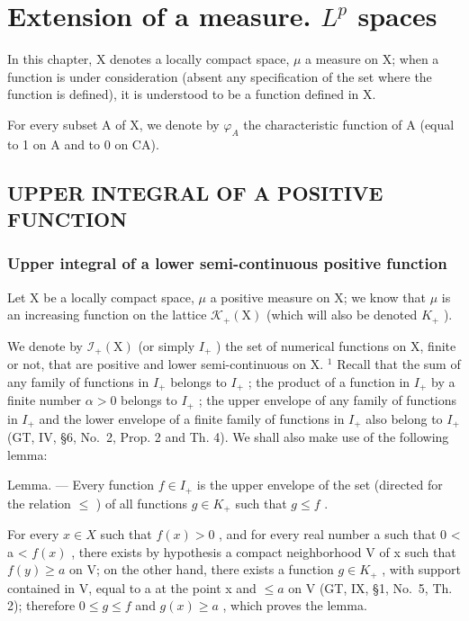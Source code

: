 \chapter{\texorpdfstring{Extension of a measure. \(L^{p}\) spaces}{Extension of a measure. L to the p spaces}}

In this chapter, X denotes a locally compact space, \(\mu\) a measure on X; when a function is under consideration (absent any specification of the set where the function is defined), it is understood to be a function defined in X.

For every subset A of X, we denote by \(\varphi_{A}\) the characteristic function of A (equal to 1 on A and to 0 on CA).

\section{UPPER INTEGRAL OF A POSITIVE FUNCTION}

\subsection{Upper integral of a lower semi-continuous positive function}

Let X be a locally compact space, \(\mu\) a positive measure on X; we know that \(\mu\) is an increasing function on the lattice \(\mathcal{K}_{+}(\mathrm{X})\) (which will also be denoted \(K_{+}\) ).

We denote by \(\mathcal{I}_{+}(\mathrm{X})\) (or simply \(I_{+}\) ) the set of numerical functions on X, finite or not, that are positive and lower semi-continuous on X. \(^{1}\) Recall that the sum of any family of functions in \(I_{+}\) belongs to \(I_{+}\) ; the product of a function in \(I_{+}\) by a finite number \(\alpha > 0\) belongs to \(I_{+}\) ; the upper envelope of any family of functions in \(I_{+}\) and the lower envelope of a finite family of functions in \(I_{+}\) also belong to \(I_{+}\) (GT, IV, §6, No.~2, Prop. 2 and Th. 4). We shall also make use of the following lemma:

Lemma. --- Every function \(f \in I_{+}\) is the upper envelope of the set (directed for the relation \(\leqslant\) ) of all functions \(g \in K_{+}\) such that \(g \leqslant f\) .

For every \(x \in X\) such that \(f(x) > 0\) , and for every real number a such that 0 < a < \(f(x)\) , there exists by hypothesis a compact neighborhood V of x such that \(f(y) \geqslant a\) on V; on the other hand, there exists a function \(g \in K_{+}\) , with support contained in V, equal to a at the point x and \(\leqslant a\) on V (GT, IX, §1, No.~5, Th. 2); therefore \(0 \leqslant g \leqslant f\) and \(g(x) \geqslant a\) , which proves the lemma.

